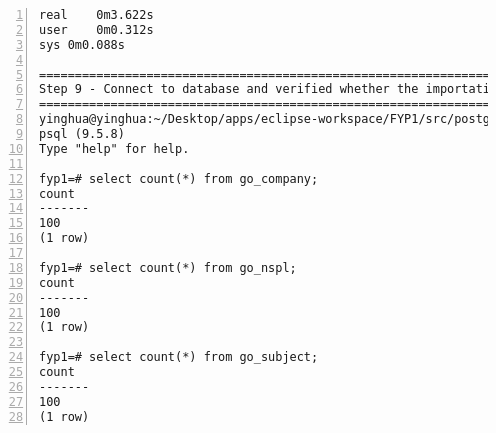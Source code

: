 \begin{lstlisting}[breaklines, frame=single, numbers=left, caption={Linux command for import data}, label=commandline-02]
real	0m3.622s
user	0m0.312s
sys	0m0.088s

===============================================================================
Step 9 - Connect to database and verified whether the importation is success
===============================================================================
yinghua@yinghua:~/Desktop/apps/eclipse-workspace/FYP1/src/postgres-process$ psql fyp1;
psql (9.5.8)
Type "help" for help.

fyp1=# select count(*) from go_company;
count 
-------
100
(1 row)

fyp1=# select count(*) from go_nspl;
count 
-------
100
(1 row)

fyp1=# select count(*) from go_subject;
count 
-------
100
(1 row)

\end{lstlisting}




